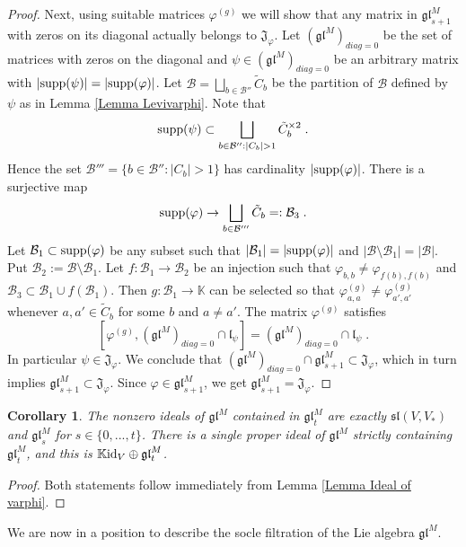 \documentclass[12pt]{article}
\def\KK {{\mathbb K}}     %
\def\B  {\mathcal B}
\def\mk {\mathfrak}
\newtheorem{coro}[theorem]{Corollary}
\begin{document}
\begin{proof}
Next, using suitable matrices $\varphi^{(g)}$ we will show that any matrix in $\mk{gl}^M_{s+1}$ with zeros on its diagonal actually belongs to $\mk J_\varphi$. Let $(\mk{gl}^M)_{diag=0}$ be the set of matrices with zeros on the diagonal and $\psi\in(\mk{gl}^M)_{diag=0}$ be an arbitrary matrix with $|{\rm supp}(\psi)|=|{\rm supp}(\varphi)|$. Let $\B=\bigsqcup\limits_{b\in\B''}\tilde C_b$ be the partition of $\B$ defined by $\psi$ as in Lemma \ref{Lemma Levivarphi}. Note that
$$
{\rm supp}(\psi)\subset \bigsqcup\limits_{b\in\B'':|C_b|>1} \tilde C_b^{\times 2} \;.
$$
Hence the set $\B'''=\{b\in\B'':|C_b|>1\}$ has cardinality $|{\rm supp}(\varphi)|$. There is a surjective map 
$$
{\rm supp}(\varphi)\to \bigsqcup\limits_{b\in\B'''} \tilde C_b =:\B_3 \;.
$$
Let $\B_1\subset{\rm supp}(\varphi)$ be any subset such that $|\B_1|=|{\rm supp}(\varphi)|$ and $|\B\setminus \B_1|=|\B|$. Put $\B_2:=\B\setminus\B_1$. Let $f:\B_1\to\B_2$ be an injection such that $\varphi_{b,b}\ne\varphi_{f(b),f(b)}$ and $\B_3\subset \B_1\cup f(\B_1)$. Then $g:\B_1\to\KK$ can be selected so that $\varphi^{(g)}_{a,a}\ne\varphi^{(g)}_{a',a'}$ whenever $a,a'\in \tilde C_b$ for some $b$ and $a\ne a'$. The matrix $\varphi^{(g)}$ satisfies
$$
[\varphi^{(g)},(\mk{gl}^M)_{diag=0}\cap\mk l_\psi]= (\mk{gl}^M)_{diag=0}\cap \mk l_\psi \;.
$$
In particular $\psi\in \mk J_{\varphi}$. We conclude that $(\mk{gl}^M)_{diag=0}\cap \mk{gl}^M_{s+1}\subset\mk J_\varphi$, which in turn implies $\mk{gl}^M_{s+1}\subset \mk J_\varphi$. Since $\varphi\in\mk{gl}^M_{s+1}$, we get $\mk{gl}^M_{s+1}= \mk J_\varphi$.
\end{proof}

\begin{coro}\label{Coro no intermed ideals}
The nonzero ideals of $\mk{gl}^M$ contained in $\mk{gl}^M_{t}$ are exactly $\mk{sl}(V,V_*)$ and $\mk{gl}^M_{s}$ for $s\in\{0,...,t\}$. There is a single proper ideal of $\mk{gl}^M$ strictly containing $\mk{gl}^M_{t}$, and this is $\KK{\rm id}_V\oplus \mk{gl}^M_{t}$.
\end{coro}

\begin{proof}
Both statements follow immediately from Lemma \ref{Lemma Ideal of varphi}. 
\end{proof}


We are now in a position to describe the socle filtration of the Lie algebra $\mk{gl}^M$.
\end{document}
